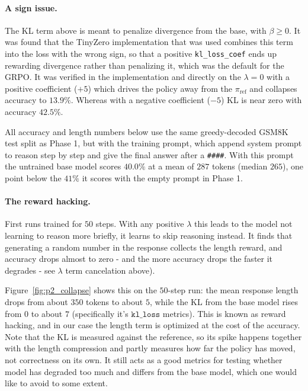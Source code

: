 \documentclass{article}
\begin{document}
\paragraph{A sign issue.}\label{sign}
The KL term above is meant to penalize divergence from the base, with $\beta\ge 0$. It was found that the TinyZero implementation that was used combines this term into the loss with the wrong sign, so that a positive \texttt{kl\_loss\_coef} ends up rewarding divergence rather than penalizing it, which was the default for the GRPO. It was verified in the implementation and directly on the $\lambda=0$ with a positive coefficient ($+5$) which drives the policy away from the $\pi_{\text{ref}}$ and collapses accuracy to $13.9\%$. Whereas with a negative coefficient ($-5$) KL is near zero with accuracy $42.5\%$.

All accuracy and length numbers below use the same greedy-decoded GSM8K test split as Phase 1, but with the training prompt, which append system prompt to reason step by step and give the final answer after a \texttt{\#\#\#\#}. With this prompt the untrained base model scores $40.0\%$ at a mean of $287$ tokens (median $265$), one point below the $41\%$ it scores with the empty prompt in Phase 1.

\paragraph{The reward hacking.}
First runs trained for $50$ steps. With any positive $\lambda$ this leads to the model not learning to reason more briefly, it learns to skip reasoning instead. It finds that generating a random number in the response collects the length reward, and accuracy drops almost to zero - and the more accuracy drops the faster it degrades - see $\lambda$ term cancelation above).

Figure~\ref{fig:p2_collapse} shows this on the $50$-step run: the mean response length drops from about $350$ tokens to about $5$, while the KL from the base model rises from $0$ to about $7$ (specifically it's $\texttt{kl\_loss}$ metrics). This is known as reward hacking, and in our case the length term is optimized at the cost of the accuracy. Note that the KL is measured against the reference, so its spike happens together with the length compression and partly measures how far the policy has moved, not correctness on its own. It still acts as a good metrics for testing whether model has degraded too much and differs from the base model, which one would like to avoid to some extent.
\end{document}
